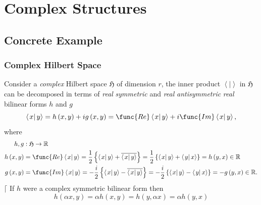 \documentclass[aps,preprint]{revtex4}
\begin{document}
\section{Complex Structures}

\subsection{Concrete Example}

\subsubsection{Complex Hilbert Space}

Consider a \emph{complex} Hilbert space $\mathfrak{H}$ of dimension $r$, the
inner product $\left\langle \left. {}\right\vert \right\rangle $ in $%
\mathfrak{H}$ can be decomposed in terms of \emph{real} \emph{symmetric} and 
\emph{real} \emph{antisymmetric} \emph{real} bilinear forms $h$ and $g$ 
\begin{equation}
\left\langle \left. x\right\vert y\right\rangle =h\left( x,y\right)
+ig\left( x,y\right) =\func{Re}\left\langle \left. x\right\vert
y\right\rangle +i\func{Im}\left\langle \left. x\right\vert y\right\rangle ,
\end{equation}%
where 
\begin{align}
h,g& :\mathfrak{H}\rightarrow \mathbb{R} \\
h\left( x,y\right) & =\func{Re}\left\langle \left. x\right\vert
y\right\rangle =\frac{1}{2}\left\{ \left\langle \left. x\right\vert
y\right\rangle +\overline{\left\langle \left. x\right\vert y\right\rangle }%
\right\} =\frac{1}{2}\left\{ \left\langle \left. x\right\vert y\right\rangle
+\left\langle \left. y\right\vert x\right\rangle \right\} =h\left(
y,x\right) \in \mathbb{R} \\
g\left( x,y\right) & =\func{Im}\left\langle \left. x\right\vert
y\right\rangle =-\frac{i}{2}\left\{ \left\langle \left. x\right\vert
y\right\rangle -\overline{\left\langle \left. x\right\vert y\right\rangle }%
\right\} =-\frac{i}{2}\left\{ \left\langle \left. x\right\vert
y\right\rangle -\left\langle \left. y\right\vert x\right\rangle \right\}
=-g\left( y,x\right) \in \mathbb{R}.
\end{align}%
$\lceil $ If $h$ were a complex symmetric bilinear form then 
\begin{equation}
h\left( \alpha x,y\right) =\alpha h\left( x,y\right) =h\left( y,\alpha
x\right) =\alpha h\left( y,x\right)
\end{equation}%
\end{document}
